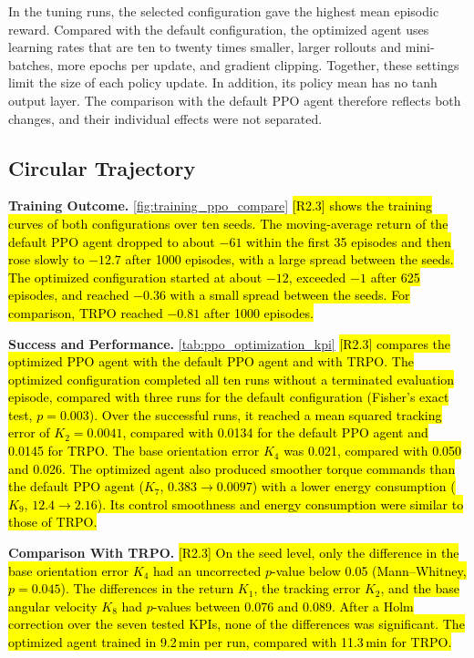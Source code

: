 \documentclass{ieeeaccess}
\newcommand{\hlone}[1]{{\sethlcolor{rone}\hl{#1}}}
\begin{document}
In the tuning runs, the selected configuration gave the highest mean episodic reward.
Compared with the default configuration, the optimized agent uses learning rates that are
ten to twenty times smaller, larger rollouts and mini-batches, more epochs per update, and gradient
clipping. Together, these settings limit the size of each policy update. In addition, its
policy mean has no tanh output layer. The comparison with the default PPO agent therefore reflects both
changes, and their individual effects were not separated.

\subsection{Circular Trajectory}

\textbf{Training Outcome.} \cref{fig:training_ppo_compare} \hlone{[R2.3] shows the training curves of both
configurations over ten seeds. The moving-average return of the default PPO agent dropped to about $-61$
within the first 35 episodes and then rose slowly to $-12.7$ after 1000 episodes, with a large spread
between the seeds. The optimized configuration started at about $-12$, exceeded $-1$ after 625 episodes,
and reached $-0.36$ with a small spread between the seeds. For comparison, TRPO reached $-0.81$ after 1000
episodes.}

\textbf{Success and Performance.} \cref{tab:ppo_optimization_kpi} \hlone{[R2.3] compares the optimized PPO agent with the
default PPO agent and with TRPO. The optimized configuration completed all ten runs without a terminated
evaluation episode, compared with three runs for the default configuration (Fisher's exact test,
$p = 0.003$). Over the successful runs, it reached a mean squared tracking error of $K_2 = 0.0041$,
compared with 0.0134 for the default PPO agent and 0.0145 for TRPO. The base orientation error $K_4$ was
0.021, compared with 0.050 and 0.026. The optimized agent also produced smoother torque commands than the
default PPO agent ($K_7$, $0.383 \to 0.0097$) with a lower energy consumption ($K_9$, $12.4 \to 2.16$).
Its control smoothness and energy consumption were similar to those of TRPO.}

\textbf{Comparison With TRPO.} \hlone{[R2.3] On the seed level, only the difference in the base
orientation error $K_4$ had an uncorrected $p$-value below 0.05 (Mann--Whitney, $p = 0.045$). The
differences in the return $K_1$, the tracking error $K_2$, and the base angular velocity $K_8$ had
$p$-values between 0.076 and 0.089. After a Holm correction over the seven tested KPIs, none of the
differences was significant. The optimized agent trained in 9.2\,min per run, compared with 11.3\,min
for TRPO.}
\end{document}
